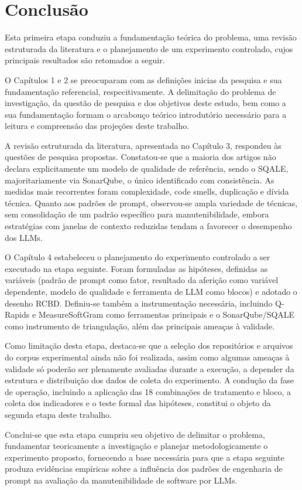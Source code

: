 \chapter{Conclusão}
\label{cap:conclusao}

Esta primeira etapa conduziu a fundamentação teórica do problema, uma revisão estruturada da literatura e o planejamento de um experimento controlado, cujos principais resultados são retomados a seguir.

O Capítulos 1 e 2 se preocuparam com as definições inicias da pesquisa e sua fundamentação referencial, respecitivamente. A delimitação do problema de investigação, da questão de pesquisa e dos objetivos deste estudo, bem como a sua fundamentação formam o arcabouço teórico introdutório necessário para a leitura e compreensão das projeções deste trabalho.

A revisão estruturada da literatura, apresentada no Capítulo 3, respondeu às questões de pesquisa propostas. Constatou-se que a maioria dos artigos não declara explicitamente um modelo de qualidade de referência, sendo o SQALE, majoritariamente via SonarQube, o único identificado com consistência. As medidas mais recorrentes foram complexidade, code smells, duplicação e dívida técnica. Quanto aos padrões de prompt, observou-se ampla variedade de técnicas, sem consolidação de um padrão específico para manutenibilidade, embora estratégias com janelas de contexto reduzidas tendam a favorecer o desempenho dos LLMs.

O Capítulo 4 estabeleceu o planejamento do experimento controlado a ser executado na etapa seguinte. Foram formuladas as hipóteses, definidas as variáveis (padrão de prompt como fator, resultado da aferição como variável dependente, modelo de qualidade e ferramenta de LLM como blocos) e adotado o desenho RCBD. Definiu-se também a instrumentação necessária, incluindo Q-Rapids e MeasureSoftGram como ferramentas principais e o SonarQube/SQALE como instrumento de triangulação, além das principais ameaças à validade.

Como limitação desta etapa, destaca-se que a seleção dos repositórios e arquivos do corpus experimental ainda não foi realizada, assim como algumas ameaças à validade só poderão ser plenamente avaliadas durante a execução, a depender da estrutura e distribuição dos dados de coleta do experimento. A condução da fase de operação, incluindo a aplicação das 18 combinações de tratamento e bloco, a coleta dos indicadores e o teste formal das hipóteses, constitui o objeto da segunda etapa deste trabalho.

Conclui-se que esta etapa cumpriu seu objetivo de delimitar o problema, fundamentar teoricamente a investigação e planejar metodologicamente o experimento proposto, fornecendo a base necessária para que a etapa seguinte produza evidências empíricas sobre a influência dos padrões de engenharia de prompt na avaliação da manutenibilidade de software por LLMs.